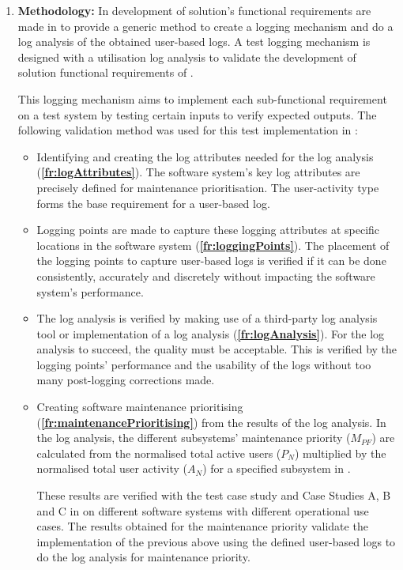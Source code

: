 \begin{enumerate}[label=\textbf{\Roman*.}]
	\item \textbf{Methodology:} In  development of solution's functional requirements are made in  to provide a generic method to create a logging mechanism and do a log analysis of the obtained user-based logs. A test logging mechanism is designed with a utilisation log analysis to validate the development of solution functional requirements of .\par This logging mechanism aims to implement each sub-functional requirement on a test system by testing certain inputs to verify expected outputs. The following validation method was used for this test implementation in :
		\begin{itemize}
			\item Identifying and creating the log attributes needed for the log analysis (\textbf{\ref{fr:logAttributes}}). The software system's key log attributes are precisely defined for maintenance prioritisation. The user-activity type forms the base requirement for a user-based log.
			
			\item Logging points are made to capture these logging attributes at specific locations in the software system (\textbf{\ref{fr:loggingPoints}}). The placement of the logging points to capture user-based logs is verified if it can be done consistently, accurately and discretely without impacting the software system's performance. 
			
			\item The log analysis is verified by making use of a third-party log analysis tool or implementation of a log analysis (\textbf{\ref{fr:logAnalysis}}). For the log analysis to succeed, the quality must be acceptable. This is verified by the logging points' performance and the usability of the logs without too many post-logging corrections made.
			
			\item Creating software maintenance prioritising (\textbf{\ref{fr:maintenancePrioritising}}) from the results of the log analysis. In the log analysis, the different subsystems' maintenance priority ($M_{PF}$) are calculated from the normalised total active users ($P_N$) multiplied by the normalised total user activity ($A_N$) for a specified subsystem in .\par These results are verified with the test case study and Case Studies A, B and C in  on different software systems with different operational use cases. The results obtained for the maintenance priority validate the implementation of the previous above using the defined user-based logs to do the log analysis for maintenance priority. 
		\end{itemize}


\end{enumerate}
